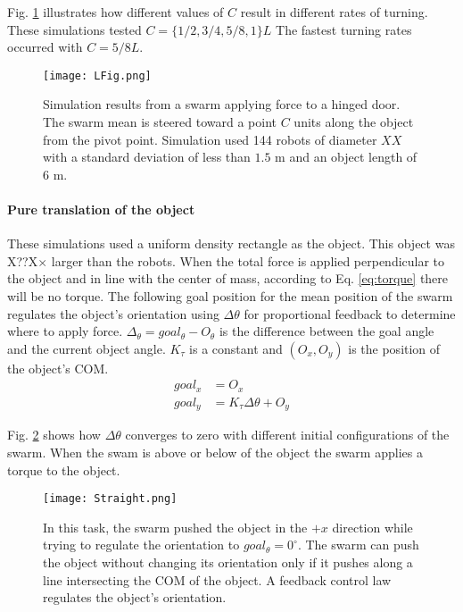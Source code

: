  Fig. \ref{fig:LFig} illustrates how different values of $C$ result in different rates of turning. These simulations tested $C = \{1/2, 3/4, 5/8, 1\}L$  The fastest turning rates occurred with  $C =  5/8L$. 



\begin{figure}
\begin{center}
	\texttt{[image: LFig.png]}
\end{center}
\vspace{-1em}
\caption{\label{fig:LFig}
Simulation results from a swarm applying force to a hinged door. 
The swarm mean is steered toward a point $C$ units along the object from the pivot point. 
 Simulation used 144 robots of diameter $XX$ with a standard deviation of less than $1.5$ m and an object length of $6$ m.
}
\vspace{-1em}
\end{figure}
\paragraph{Pure translation of the object} \label{para:PureTranslation}
These simulations used a uniform density rectangle as the object. This object was X??X$\times$ larger than the robots.
When the total force is applied perpendicular to the object and in line with the center of mass, according to Eq. \ref{eq:torque} there will be no torque. 
The following goal position for the mean position of the swarm regulates the object's orientation using $\Delta \theta$ for proportional feedback  to determine where to apply force.
$\Delta_\theta = goal_\theta - O_\theta$ is the difference between the goal angle and the current object angle.
 $K_\tau$ is a constant and $(O_x,O_y)$ is the position of the object's COM.
\begin{align}
goal_x &= O_x \nonumber \\
goal_y &= K_\tau \Delta\theta + O_y
\end{align}

 Fig. \ref{fig:PosControlFig} shows how $\Delta \theta$ converges to zero with different initial configurations of the swarm. When the swam is above or below of the object the swarm applies a torque to the object.
 
 
\begin{figure}
\begin{center}
	\texttt{[image: Straight.png]}
\end{center}
\vspace{-1em}
\caption{\label{fig:PosControlFig}
In this task, the swarm pushed the object in the $+x$ direction while trying to regulate the orientation to $goal_\theta = 0^\circ$.
 The swarm can push the object without changing its orientation only if it pushes along a line intersecting the COM of the object.  A feedback control law regulates the object's orientation.
}
\vspace{-1em}
\end{figure}

